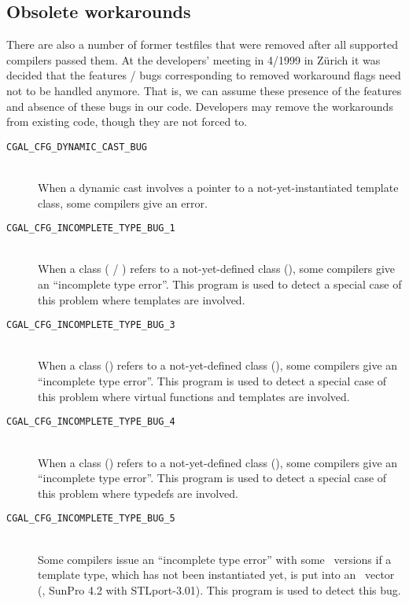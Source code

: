 \subsection{Obsolete workarounds}
\label{sec:obsolete_workarounds}

\noindent 
There are also a number of former testfiles that were removed 
after all supported compilers passed them. At the developers' meeting
in 4/1999 in Z\"urich it was decided that the features / bugs corresponding
to removed workaround flags need not to be handled anymore. That is, we
can assume these presence of the features and absence of these bugs in our
code. Developers may remove the workarounds from existing code, though
they are not forced to.

\begin{description}
\item[{\tt CGAL\_CFG\_DYNAMIC\_CAST\_BUG}]~\\
 When a dynamic cast involves a pointer to a not-yet-instantiated 
 template class, some compilers give an error.

\item[{\tt CGAL\_CFG\_INCOMPLETE\_TYPE\_BUG\_1}]~\\
  When a class ( / ) refers to a not-yet-defined class
  (), some compilers give an ``incomplete type error''.  This
  program is used to detect a special case of this problem where
  templates are involved.

\item[{\tt CGAL\_CFG\_INCOMPLETE\_TYPE\_BUG\_3}]~\\
  When a class () refers to a not-yet-defined class (), some
  compilers give an ``incomplete type error''.  This program is used
  to detect a special case of this problem where virtual functions and
  templates are involved.

\item[{\tt CGAL\_CFG\_INCOMPLETE\_TYPE\_BUG\_4}]~\\
  When a class () refers to a not-yet-defined class (), some
  compilers give an ``incomplete type error''.  This program is used
  to detect a special case of this problem where typedefs are
  involved.

\item[{\tt CGAL\_CFG\_INCOMPLETE\_TYPE\_BUG\_5}]~\\
  Some compilers issue an ``incomplete type error'' with some \stl\
  versions if a template type, which has not been instantiated yet, is
  put into an \stl\ vector (\eg, SunPro 4.2 with STLport-3.01). This
  program is used to detect this bug.


\end{description}
